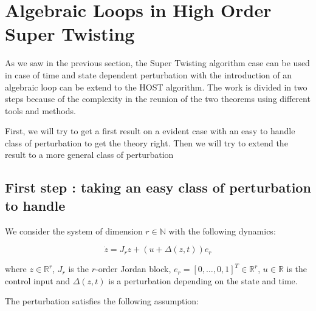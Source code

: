 \newpage
\section{Algebraic Loops in High Order Super Twisting}

As we saw in the previous section, the Super Twisting algorithm case can be used in case of time and state dependent
perturbation with the introduction of an algebraic loop can be extend to the HOST algorithm. The work is divided
in two steps because of the complexity in the reunion of the two theorems using different tools and methods.

First, we will try to get a first result on a evident case with an easy to handle class of perturbation to 
get the theory right. Then we will try to extend the result to a more general class of perturbation

\subsection{First step : taking an easy class of perturbation to handle}

We consider the system of dimension \(r \in \mathbb{N}\) with the following dynamics:

\begin{equation}
    \dot{z} = J_r z + (u + \Delta(z, t)) e_r
\end{equation}

where \(z \in \mathbb{R}^r\), \(J_r\) is the \(r\)-order Jordan block, \(e_r = [0, \ldots, 0, 1]^T \in \mathbb{R}^r\),
\(u \in \mathbb{R}\) is the control input and \(\Delta(z, t)\) is a perturbation depending on the state and time.

The perturbation satisfies the following assumption:

